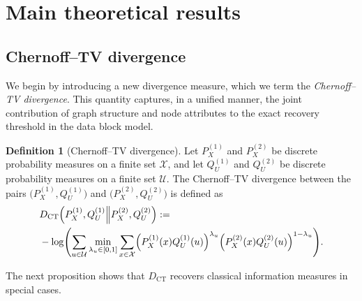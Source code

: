 \documentclass[11pt]{article}
\theoremstyle{plain}
\theoremstyle{definition}
\newtheorem{definition}[theorem]{Definition}
\begin{document}
\section{Main theoretical results}\label{sec:main}

\subsection{Chernoff--TV divergence}

We begin by introducing a new divergence measure, which we term the \emph{Chernoff--TV divergence}.
This quantity captures, in a unified manner, the joint contribution of graph structure and node attributes to the exact recovery threshold in the data block model.

\begin{definition}[Chernoff--TV divergence]
Let $P_X^{(1)}$ and $P_X^{(2)}$ be discrete probability measures on a finite set $\mathcal{X}$, and let
$Q_U^{(1)}$ and $Q_U^{(2)}$ be discrete probability measures on a finite set $\mathcal{U}$.
The Chernoff--TV divergence between the pairs $\bigl(P_X^{(1)},Q_U^{(1)}\bigr)$ and
$\bigl(P_X^{(2)},Q_U^{(2)}\bigr)$ is defined as
\begin{align*}
&D_{\rm{CT}}\Bigl(P^{(1)}_X,Q^{(1)}_U\Big\|P^{(2)}_X,Q^{(2)}_U\Bigr):=\\&-\log \Biggl(\sum_{u \in \mathcal{U}}
		\min_{\lambda_u \in [0,1]}
    \sum_{x\in \mathcal{X}} 
    \Bigl(P_X^{(1)}(x)Q_U^{(1)}(u)\Bigr)^{\lambda_u} \Bigl(P_X^{(2)}(x)Q_U^{(2)}(u)\Bigr)^{1-\lambda_u}\Biggr)
    . 
\end{align*}
\end{definition}
The next proposition shows that $D_{\mathrm{CT}}$ recovers classical information measures in special cases.
\end{document}
